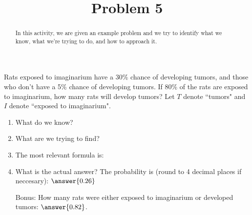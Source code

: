 \documentclass{ximera}
\title{Problem 5}
\begin{document}
      
\begin{abstract}
      
In this activity, we are given an example problem and we try to identify what we know, what we're trying to do, and how to approach it.
      
\end{abstract}
      
\maketitle
      
 
Rats exposed to imaginarium have a 30\% chance of developing tumors, and those who don't have a 5\% chance of developing tumors.  If 80\% of the rats are exposed to imaginarium, how many rats will develop tumors?  Let $T$ denote ``tumors" and $I$ denote ``exposed to imaginarium".
 
 \begin{enumerate}
\item What do we know?

\begin{selectAll}

\end{selectAll}

\item What are we trying to find?

\begin{multipleChoice}




\end{multipleChoice}

\item The most relevant formula is:

\begin{multipleChoice}
\end{multipleChoice}

\item What is the actual answer?  The probability is (round to 4 decimal places if neccesary): $\answer{0.26}$

\item[Bonus:] How many rats were either exposed to imaginarium or developed tumors: $\answer{0.82}$.

\end{enumerate}

 
 
 
 
      
\end{document}
